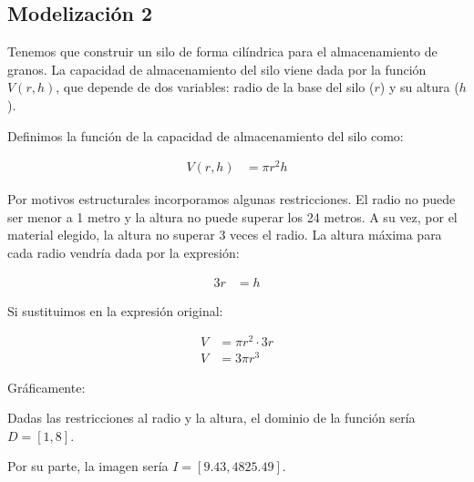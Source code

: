 \subsection*{Modelización 2}

Tenemos que construir un silo de forma cilíndrica para el almacenamiento de granos. La capacidad de almacenamiento del silo viene dada por la función $V(r, h)$, que depende de dos variables: radio de la base del silo ($r$) y su altura ($h$).

\begin{center}
\end{center}

Definimos la función de la capacidad de almacenamiento del silo como:

\begin{align*}
    V(r, h) &= \pi r^2h
\end{align*}

Por motivos estructurales incorporamos algunas restricciones. El radio no puede ser menor a 1 metro y la altura no puede superar los 24 metros. A su vez, por el material elegido, la altura no superar 3 veces el radio. La altura máxima para cada radio vendría dada por la expresión:

\begin{align*}
    3r &= h
\end{align*}

Si sustituimos en la expresión original:

\begin{align*}
    V &= \pi r^2 \cdot 3r\\
    V &= 3 \pi r^3
\end{align*}

Gráficamente:

\begin{center}
\end{center}

Dadas las restricciones al radio y la altura, el dominio de la función sería $D = [1, 8]$.

Por su parte, la imagen sería $I = [9.43, 4825.49]$.
